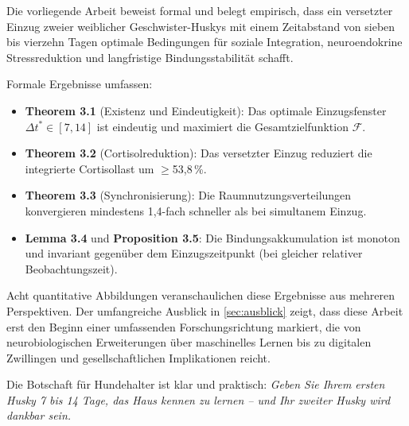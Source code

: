 ﻿\documentclass[12pt, a4paper]{article}
\theoremstyle{plain}
\theoremstyle{definition}
\theoremstyle{remark}
\newcommand{\dt}{\Delta t}
\begin{document}
Die vorliegende Arbeit beweist formal und belegt empirisch, dass ein versetzter
Einzug zweier weiblicher Geschwister-Huskys mit einem Zeitabstand von sieben
bis vierzehn Tagen optimale Bedingungen für soziale Integration,
neuroendokrine Stressreduktion und langfristige Bindungsstabilität schafft.

Formale Ergebnisse umfassen:
\begin{itemize}[leftmargin=*]
  \item \textbf{Theorem 3.1} (Existenz und Eindeutigkeit): Das optimale
    Einzugsfenster $\dt^* \in [7, 14]$ ist eindeutig und maximiert die
    Gesamtzielfunktion $\mathcal{F}$.
  \item \textbf{Theorem 3.2} (Cortisolreduktion): Das versetzter Einzug
    reduziert die integrierte Cortisollast um $\geq$53{,}8\,\%.
  \item \textbf{Theorem 3.3} (Synchronisierung): Die Raumnutzungsverteilungen
    konvergieren mindestens 1{,}4-fach schneller als bei simultanem Einzug.
  \item \textbf{Lemma 3.4} und \textbf{Proposition 3.5}: Die Bindungsakkumulation
    ist monoton und invariant gegenüber dem Einzugszeitpunkt (bei gleicher
    relativer Beobachtungszeit).
\end{itemize}

Acht quantitative Abbildungen veranschaulichen diese Ergebnisse aus mehreren
Perspektiven. Der umfangreiche Ausblick in \cref{sec:ausblick} zeigt, dass
diese Arbeit erst den Beginn einer umfassenden Forschungsrichtung markiert,
die von neurobiologischen Erweiterungen über maschinelles Lernen bis zu
digitalen Zwillingen und gesellschaftlichen Implikationen reicht.

Die Botschaft für Hundehalter ist klar und praktisch: \emph{Geben Sie
Ihrem ersten Husky 7 bis 14 Tage, das Haus kennen zu lernen -- und Ihr zweiter
Husky wird dankbar sein.}

\printbibliography[heading=bibintoc, title={Literatur}]
\end{document}
